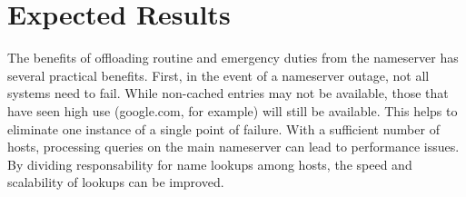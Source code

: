 \documentclass[12pt,letterpaper]{article}
\begin{document}
\section{Expected Results}
The benefits of offloading routine and emergency duties from the nameserver has several practical benefits. First, in the event of a nameserver outage, not all systems need to fail. While non-cached entries may not be available, those that have seen high use (google.com, for example) will still be available. This helps to eliminate one instance of a single point of failure. With a sufficient number of hosts, processing queries on the main nameserver can lead to performance issues. By dividing responsability for name lookups among hosts, the speed and scalability of lookups can be improved.
\end{document}
